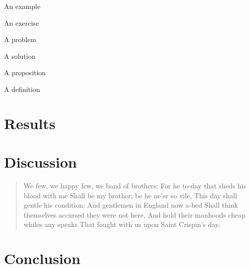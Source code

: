 \begin{example}
An example
\end{example}

\begin{exercise}
An exercise
\end{exercise}

\begin{problem}
A problem
\end{problem}

\begin{solution}
A solution
\end{solution}

\begin{proposition}
A proposition
\end{proposition}


\begin{definition}
A definition
\end{definition}

\begin{note}
\lipsum[1]
\end{note}

\begin{remark}
\lipsum[1]
\end{remark}

\chapter{Results}

\lipsum{}
\chapter{Discussion}

\begin{quote}
We few, we happy few, we band of brothers;
For he to-day that sheds his blood with me
Shall be my brother; be he ne'er so vile,
This day shall gentle his condition:
And gentlemen in England now a-bed
Shall think themselves accursed they were not here,
And hold their manhoods cheap whiles any speaks
That fought with us upon Saint Crispin's day.
\end{quote}

\lipsum[2-4]

\chapter{Conclusion}

\lipsum{}

\backmatter
\printbibliography{} %
\cleardoublepage{}
\listoftheorems[ignore={note,remark}]


